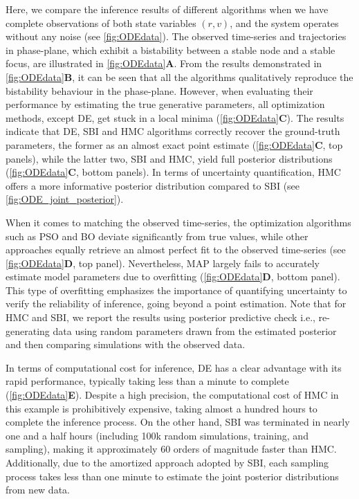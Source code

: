 \documentclass[preprint,11pt,authoryear]{elsarticle}
\begin{document}
Here, we compare the inference results of different algorithms when we have complete observations of both state variables $(r,v)$, and the system operates without any noise (see \autoref{fig:ODEdata}). The observed time-series and trajectories in phase-plane, which exhibit a bistability between a stable node and a stable focus, are illustrated in \autoref{fig:ODEdata}\textbf{A}. From the results demonstrated in \autoref{fig:ODEdata}\textbf{B}, it can be seen that all the algorithms qualitatively reproduce the bistability behaviour in the phase-plane. However, when evaluating their performance by estimating the true generative parameters, all optimization methods, except DE, get stuck in a local minima (\autoref{fig:ODEdata}\textbf{C}). The results indicate that DE, SBI and HMC algorithms correctly recover the ground-truth parameters, the former as an almost exact point estimate (\autoref{fig:ODEdata}\textbf{C}, top panels), while the latter two, SBI and HMC, yield full posterior distributions (\autoref{fig:ODEdata}\textbf{C}, bottom panels).  In terms of uncertainty quantification, HMC offers a more informative posterior distribution compared to SBI (see \autoref{fig:ODE_joint_posterior}).

When it comes to matching the observed time-series, the optimization algorithms such as PSO and BO deviate significantly from true values, while other approaches equally retrieve an almost perfect fit to the observed time-series (see \autoref{fig:ODEdata}\textbf{D}, top panel). Nevertheless, MAP largely fails to accurately estimate model parameters due to overfitting (\autoref{fig:ODEdata}\textbf{D}, bottom panel). This type of overfitting emphasizes the importance of quantifying uncertainty to verify the reliability of inference, going beyond a point estimation. Note that for HMC and SBI, we report the results using posterior predictive check i.e., re-generating data using random parameters drawn from the estimated posterior and then comparing simulations with the observed data.

In terms of computational cost for inference, DE has a clear advantage with its rapid performance, typically taking less than a minute to complete (\autoref{fig:ODEdata}\textbf{E}). Despite a high precision, the computational cost of HMC in this example is prohibitively expensive, taking almost a hundred hours to complete the inference process. On the other hand, SBI was terminated in nearly one and a half hours (including 100k random simulations, training, and sampling), making it approximately 60 orders of magnitude faster than HMC. Additionally, due to the amortized approach adopted by SBI, each sampling process takes less than one minute to estimate the joint posterior distributions from new data. 
\end{document}
